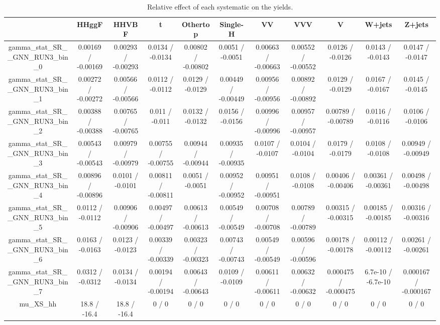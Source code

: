 \documentclass[10pt]{article}
\begin{document}
\begin{table}[htbp]
\begin{center}
\begin{tabular}{|c|c|c|c|c|c|c|c|c|c|c|}
\hline 
      & HHggF      & HHVBF      & t      & Othertop      & Single-H      & VV      & VVV      & V      & W+jets      & Z+jets \\ 
\hline 
  gamma_stat_SR__GNN_RUN3_bin_0 & 0.00169 / -0.00169 & 0.00293 / -0.00293 & 0.0134 / -0.0134 & 0.00802 / -0.00802 & 0.0051 / -0.0051 & 0.00663 / -0.00663 & 0.00552 / -0.00552 & 0.0126 / -0.0126 & 0.0143 / -0.0143 & 0.0147 / -0.0147 \\ 
  gamma_stat_SR__GNN_RUN3_bin_1 & 0.00272 / -0.00272 & 0.00566 / -0.00566 & 0.0112 / -0.0112 & 0.0129 / -0.0129 & 0.00449 / -0.00449 & 0.00956 / -0.00956 & 0.00892 / -0.00892 & 0.0129 / -0.0129 & 0.0167 / -0.0167 & 0.0145 / -0.0145 \\ 
  gamma_stat_SR__GNN_RUN3_bin_2 & 0.00388 / -0.00388 & 0.00765 / -0.00765 & 0.011 / -0.011 & 0.0132 / -0.0132 & 0.0156 / -0.0156 & 0.00996 / -0.00996 & 0.00957 / -0.00957 & 0.00789 / -0.00789 & 0.0116 / -0.0116 & 0.0106 / -0.0106 \\ 
  gamma_stat_SR__GNN_RUN3_bin_3 & 0.00543 / -0.00543 & 0.00979 / -0.00979 & 0.00755 / -0.00755 & 0.00944 / -0.00944 & 0.00935 / -0.00935 & 0.0107 / -0.0107 & 0.0104 / -0.0104 & 0.0179 / -0.0179 & 0.0108 / -0.0108 & 0.00949 / -0.00949 \\ 
  gamma_stat_SR__GNN_RUN3_bin_4 & 0.00896 / -0.00896 & 0.0101 / -0.0101 & 0.00811 / -0.00811 & 0.0051 / -0.0051 & 0.00952 / -0.00952 & 0.00951 / -0.00951 & 0.0108 / -0.0108 & 0.00406 / -0.00406 & 0.00361 / -0.00361 & 0.00498 / -0.00498 \\ 
  gamma_stat_SR__GNN_RUN3_bin_5 & 0.0112 / -0.0112 & 0.00906 / -0.00906 & 0.00497 / -0.00497 & 0.00613 / -0.00613 & 0.00549 / -0.00549 & 0.00708 / -0.00708 & 0.00789 / -0.00789 & 0.00315 / -0.00315 & 0.00185 / -0.00185 & 0.00316 / -0.00316 \\ 
  gamma_stat_SR__GNN_RUN3_bin_6 & 0.0163 / -0.0163 & 0.0123 / -0.0123 & 0.00339 / -0.00339 & 0.00323 / -0.00323 & 0.00743 / -0.00743 & 0.00549 / -0.00549 & 0.00596 / -0.00596 & 0.00178 / -0.00178 & 0.00112 / -0.00112 & 0.00261 / -0.00261 \\ 
  gamma_stat_SR__GNN_RUN3_bin_7 & 0.0312 / -0.0312 & 0.0134 / -0.0134 & 0.00194 / -0.00194 & 0.00643 / -0.00643 & 0.0109 / -0.0109 & 0.00611 / -0.00611 & 0.00632 / -0.00632 & 0.000475 / -0.000475 & 6.7e-10 / -6.7e-10 & 0.000167 / -0.000167 \\ 
  mu_XS_hh & 18.8 / -16.4 & 18.8 / -16.4 & 0 / 0 & 0 / 0 & 0 / 0 & 0 / 0 & 0 / 0 & 0 / 0 & 0 / 0 & 0 / 0 \\ 
\hline 
\end{tabular} 
\caption{Relative effect of each systematic on the yields.} 
\end{center} 
\end{table} 
\end{document}
